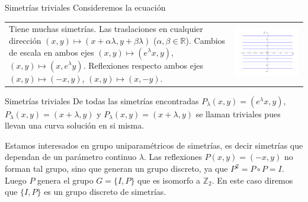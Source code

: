 \documentclass[handout,hyperref={colorlinks=true}]{beamer}
\newcommand{\rr}{\mathbb{R}}
\renewcommand{\emph}[1]{\textcolor[rgb]{1,0,0}{#1}}
\begin{document}
\begin{frame}{Simetrías triviales}
Consideremos la ecuación


\begin{tabular}{m{5cm}m{5cm}}
Tiene muchas simetrías. Las traslaciones en cualquier dirección $(x,y)\mapsto (x+\alpha \lambda,y+\beta\lambda)$ ($\alpha,\beta\in\rr$). Cambios de escala en ambos ejes  $(x,y)\mapsto (e^{\lambda}x,y)$, $(x,y)\mapsto (x,e^{\lambda}y)$. Reflexiones respecto ambos ejes  $(x,y)\mapsto (-x,y)$, $(x,y)\mapsto (x,-y)$.
& 
\includegraphics[scale=.3]{imagenes/sol_trivial.png}\\
\end{tabular}
\end{frame}


\begin{frame}{Simetrías triviales}
De todas las simetrías encontradas $P_{\lambda}(x,y)=(e^{\lambda}x,y)$, $P_{\lambda}(x,y)=(x+\lambda,y)$ y  $P_{\lambda}(x,y)=(x+\lambda,y)$ se llaman \emph{triviales} pues llevan una curva solución en si misma. 

Estamos interesados en grupo uniparamétricos de simetrías, es decir simetrías que dependan de un parámetro continuo $\lambda$. Las reflexiones $P(x,y)=(-x,y)$  no forman tal grupo, sino que generan un grupo discreto, ya que $P^2=P\circ P=I$. Luego $P$ genera el grupo $G=\{I,P\}$ que es isomorfo a $\mathbb{Z}_2$. En este caso diremos que    $\{I,P\}$ es un \emph{grupo discreto} de simetrías. 
\end{frame}
\end{document}

